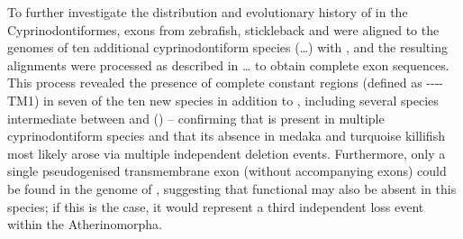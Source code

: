 	To further investigate the distribution and evolutionary history of  in the Cyprinodontiformes,  exons from zebrafish, stickleback and \Xma were aligned to the genomes of ten additional cyprinodontiform species (\dots) %
with , and the resulting alignments were processed as described in \dots %
to obtain complete exon sequences. This process revealed the presence of complete  constant regions (defined as ----TM1)%
in seven of the ten new species in addition to \Xma, including several species intermediate between \Xma and \Nfu () -- confirming that  is present in multiple cyprinodontiform species and that its absence in medaka and turquoise killifish most likely arose via multiple independent deletion events. Furthermore, only a single pseudogenised transmembrane exon (without accompanying \cz{} exons) could be found in the genome of , suggesting that functional  may also be absent in this species; if this is the case, it would represent a third independent loss event within the Atherinomorpha.

